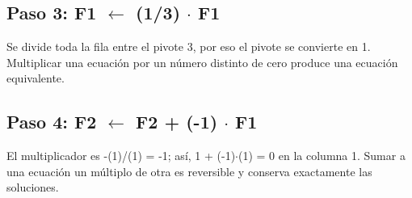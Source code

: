 \documentclass[conference]{IEEEtran}
\begin{document}

\medskip
\subsection*{Paso 3: F1 \(\leftarrow\) (1/3) \(\cdot\) F1}
Se divide toda la fila entre el pivote 3, por eso el pivote se convierte en 1. Multiplicar una ecuación por un número distinto de cero produce una ecuación equivalente.


\medskip
\subsection*{Paso 4: F2 \(\leftarrow\) F2 + (-1) \(\cdot\) F1}
El multiplicador es -(1)/(1) = -1; así, 1 + (-1)\(\cdot\)(1) = 0 en la columna 1. Sumar a una ecuación un múltiplo de otra es reversible y conserva exactamente las soluciones.

\end{document}
